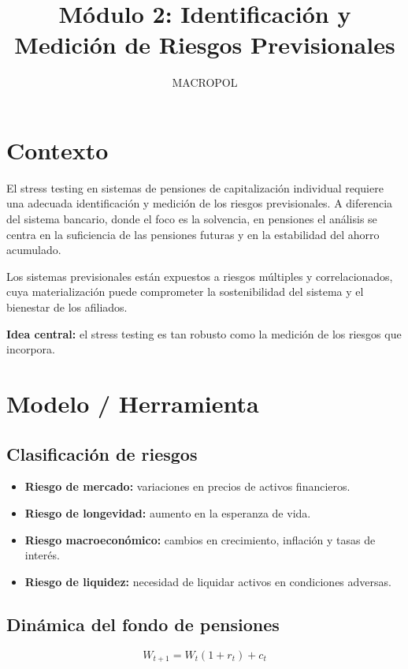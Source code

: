 \documentclass[12pt]{article}
\title{Módulo 2: Identificación y Medición de Riesgos Previsionales}
\author{MACROPOL}
\date{}
\begin{document}
\maketitle

\section{Contexto}

El stress testing en sistemas de pensiones de capitalización individual requiere una adecuada identificación y medición de los riesgos previsionales. A diferencia del sistema bancario, donde el foco es la solvencia, en pensiones el análisis se centra en la suficiencia de las pensiones futuras y en la estabilidad del ahorro acumulado.

Los sistemas previsionales están expuestos a riesgos múltiples y correlacionados, cuya materialización puede comprometer la sostenibilidad del sistema y el bienestar de los afiliados.

\textbf{Idea central:} el stress testing es tan robusto como la medición de los riesgos que incorpora.

\section{Modelo / Herramienta}

\subsection{Clasificación de riesgos}

\begin{itemize}
\item \textbf{Riesgo de mercado:} variaciones en precios de activos financieros.
\item \textbf{Riesgo de longevidad:} aumento en la esperanza de vida.
\item \textbf{Riesgo macroeconómico:} cambios en crecimiento, inflación y tasas de interés.
\item \textbf{Riesgo de liquidez:} necesidad de liquidar activos en condiciones adversas.
\end{itemize}

\subsection{Dinámica del fondo de pensiones}

\begin{equation}
W_{t+1} = W_t (1 + r_t) + c_t
\end{equation}
\end{document}
